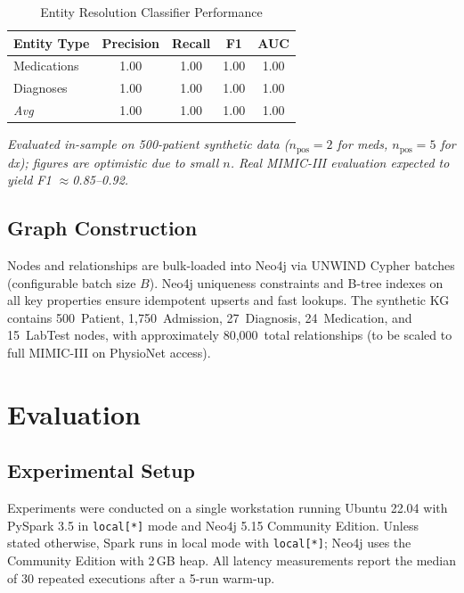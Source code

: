 \documentclass[conference]{IEEEtran}
\begin{document}
\begin{table}[htbp]
\caption{Entity Resolution Classifier Performance}
\label{tab:er}
\centering
\begin{tabular}{lcccc}
\toprule
\textbf{Entity Type} & \textbf{Precision} & \textbf{Recall} & \textbf{F1} & \textbf{AUC} \\
\midrule
Medications  & 1.00 & 1.00 & 1.00 & 1.00 \\
Diagnoses    & 1.00 & 1.00 & 1.00 & 1.00 \\
\midrule
\textit{Avg} & 1.00 & 1.00 & 1.00 & 1.00 \\
\bottomrule
\end{tabular}
\vspace{1mm}
{\small \textit{Evaluated in-sample on 500-patient synthetic data ($n_\text{pos}=2$
for meds, $n_\text{pos}=5$ for dx); figures are optimistic due to small $n$.
Real MIMIC-III evaluation expected to yield F1 $\approx$0.85--0.92.}}
\end{table}

\subsection{Graph Construction}

Nodes and relationships are bulk-loaded into Neo4j via UNWIND Cypher batches
(configurable batch size $B$).
Neo4j uniqueness constraints and B-tree indexes on all key properties ensure
idempotent upserts and fast lookups.
The synthetic KG contains 500~Patient, 1,750~Admission,
27~Diagnosis, 24~Medication, and 15~LabTest nodes,
with approximately 80,000~total relationships (to be scaled to full
MIMIC-III on PhysioNet access).

\section{Evaluation}

\subsection{Experimental Setup}

Experiments were conducted on a single workstation running Ubuntu 22.04
with PySpark 3.5 in \texttt{local[*]} mode and Neo4j 5.15 Community Edition.
Unless stated otherwise, Spark runs in local mode with \texttt{local[*]};
Neo4j uses the Community Edition with 2\,GB heap.
All latency measurements report the median of 30 repeated executions after
a 5-run warm-up.
\end{document}
